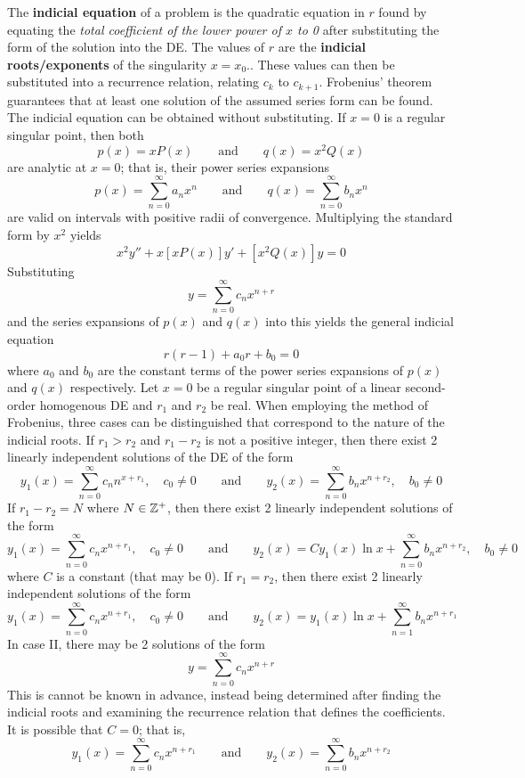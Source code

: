 \documentclass[./Differential Equations.tex]{subfiles}
\begin{document}
			The \textbf{indicial equation} of a problem is the quadratic equation in \(r\) found by equating the \textit{total coefficient of the lower power of \(x\) to 0} after substituting the form of the solution into the DE. The values of \(r\) are the \textbf{indicial roots/exponents} of the singularity \(x = x_0\).. These values can then be substituted into a recurrence relation, relating \(c_k\) to \(c_{k + 1}\). Frobenius' theorem guarantees that at least one solution of the assumed series form can be found. \\
			The indicial equation can be obtained without substituting. If \(x = 0\) is a regular singular point, then both 
				\[
					p(x) = xP(x) \qquad \text{and} \qquad
					q(x) = x^2Q(x)
				\]
				are analytic at \(x = 0\); that is, their power series expansions 
					\[
						p(x) = \sum_{n = 0}^\infty a_nx^n \qquad \text{and} \qquad
						q(x) = \sum_{n = 0}^\infty b_nx^n
					\]
				are valid on intervals with positive radii of convergence. Multiplying the standard form by \(x^2\) yields
				\[x^2y'' + x[xP(x)]y' + [x^2Q(x)]y = 0\]
				Substituting
				\[y = \sum_{n = 0}^\infty c_nx^{n + r}\]
				and the series expansions of \(p(x)\) and \(q(x)\) into this yields the general indicial equation
				\[r(r - 1) + a_0r + b_0 = 0\]
				where \(a_0\) and \(b_0\) are the constant terms of the power series expansions of \(p(x)\) and \(q(x)\) respectively.
			Let \(x = 0\) be a regular singular point of a linear second-order homogenous DE and \(r_1\) and \(r_2\) be real. When employing the method of Frobenius, three cases can be distinguished that correspond to the nature of the indicial roots.
				If \(r_1 > r_2\) and \(r_1 - r_2\) is not a positive integer, then there exist 2 linearly independent solutions of the DE of the form
					\[
						y_1(x) = \sum_{n = 0}^\infty c_nn^{x + r_1}, \quad c_0 \ne 0 \qquad \text{and} \qquad
						y_2(x) = \sum_{n = 0}^\infty b_nx^{n + r_2}, \quad b_0 \ne 0
					\]
				If \(r_1 - r_2 = N\) where \(N \in \mathbb{Z}^+\), then there exist 2 linearly independent solutions of the form
					\[
						y_1(x) = \sum_{n = 0}^\infty c_nx^{n + r_1}, \quad c_0 \ne 0 \qquad \text{and} \qquad
						y_2(x) = Cy_1(x)\ln x + \sum_{n = 0}^\infty b_nx^{n + r_2}, \quad b_0 \ne 0
					\]
					where \(C\) is a constant (that may be 0).
				If \(r_1 = r_2\), then there exist 2 linearly independent solutions of the form
					\[
						y_1(x) = \sum_{n = 0}^\infty c_nx^{n + r_1}, \quad c_0 \ne 0 \qquad \text{and} \qquad
						y_2(x) = y_1(x)\ln x + \sum_{n = 1}^\infty b_nx^{n + r_1}
					\]
			In case II, there may be 2 solutions of the form
				\[y = \sum_{n = 0}^\infty c_nx^{n + r}\]
				This is cannot be known in advance, instead being determined after finding the indicial roots and examining the recurrence relation that defines the coefficients. It is possible that \(C = 0\); that is,
				\[
					y_1(x) = \sum_{n = 0}^\infty c_nx^{n + r_1} \qquad \text{and} \qquad
					y_2(x) = \sum_{n = 0}^\infty b_nx^{n + r_2}
				\]
				
\end{document}
